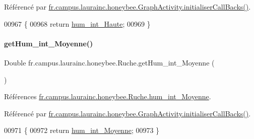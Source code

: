 Référencé par \hyperlink{classfr_1_1campus_1_1laurainc_1_1honeybee_1_1_graph_activity_a8dc56c3e0744bcb9295ad10e726b5fdb}{fr.\+campus.\+laurainc.\+honeybee.\+Graph\+Activity.\+initialiser\+Call\+Backs()}.


\begin{DoxyCode}
00967                                      \{
00968         \textcolor{keywordflow}{return} \hyperlink{classfr_1_1campus_1_1laurainc_1_1honeybee_1_1_ruche_ac6b4da59e8ad8537926cc4ca7a6d4746}{hum\_int\_Haute};
00969     \}
\end{DoxyCode}
\mbox{\label{classfr_1_1campus_1_1laurainc_1_1honeybee_1_1_ruche_ac1662e5ea81b67877e487eced61603d3}} 
\paragraph{\texorpdfstring{get\+Hum\+\_\+int\+\_\+\+Moyenne()}{getHum\_int\_Moyenne()}}
{\footnotesize\ttfamily Double fr.\+campus.\+laurainc.\+honeybee.\+Ruche.\+get\+Hum\+\_\+int\+\_\+\+Moyenne (\begin{DoxyParamCaption}{ }\end{DoxyParamCaption})}



Références \hyperlink{classfr_1_1campus_1_1laurainc_1_1honeybee_1_1_ruche_a8edae192f1f8c4578d321f4b2129cc8a}{fr.\+campus.\+laurainc.\+honeybee.\+Ruche.\+hum\+\_\+int\+\_\+\+Moyenne}.



Référencé par \hyperlink{classfr_1_1campus_1_1laurainc_1_1honeybee_1_1_graph_activity_a8dc56c3e0744bcb9295ad10e726b5fdb}{fr.\+campus.\+laurainc.\+honeybee.\+Graph\+Activity.\+initialiser\+Call\+Backs()}.


\begin{DoxyCode}
00971                                        \{
00972         \textcolor{keywordflow}{return} \hyperlink{classfr_1_1campus_1_1laurainc_1_1honeybee_1_1_ruche_a8edae192f1f8c4578d321f4b2129cc8a}{hum\_int\_Moyenne};
00973     \}
\end{DoxyCode}
\mbox{\label{classfr_1_1campus_1_1laurainc_1_1honeybee_1_1_ruche_a8e3b05a40fa1a699b7ffc1d15a7f6e31}} 
